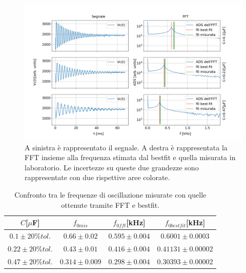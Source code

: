 \documentclass{article}
\begin{document}
        \begin{figure}[H]
            \centering
            \includegraphics[width=\textwidth]{FFT12/FFTRLC.png}
            \caption{A sinistra è rappresentato il segnale. A destra è rappresentata la FFT insieme
            alla frequenza stimata dal bestfit e quella misurata in laboratorio.
            Le incertezze su queste due grandezze sono rappresentate con due rispettive aree colorate.
            }
            \label{fig:osc_smor}
        \end{figure}

        \begin{table}[H]
            \centering
            
                \begin{tabular}{cccc}
                    $C$[$\mu$F]          &$f_{0mis}$                &   $f_{0fft}$[kHz]       & $f_{0bestfit}$[kHz] \\
                    \hline
                    $0.1 \pm 20\%tol.$   &     $0.66 \pm 0.02$      & $0.595 \pm 0.004$       & $0.6001 \pm 0.0003$ \\
                    $0.22 \pm 20\%tol.$  &$0.43 \pm 0.01$           & $0.416 \pm 0.004$       & $0.41131\pm 0.00002$ \\
                    $0.47 \pm 20\%tol.$  &$0.314 \pm 0.009 $        &$0.298 \pm 0.004$        & $0.30393\pm 0.00002$ \\
                \end{tabular}
                \caption{Confronto tra le frequenze di oscillazione misurate 
                con quelle ottenute tramite FFT e bestfit.}
                \label{tab:osc_smor}
        \end{table}
    
\end{document}
